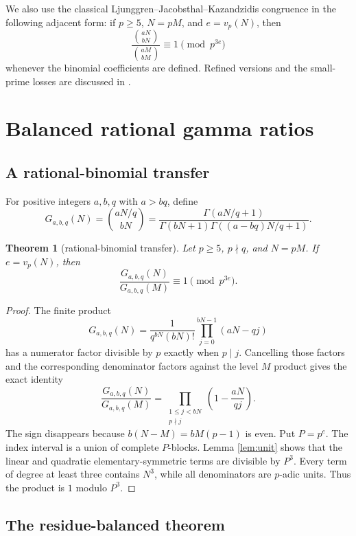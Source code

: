 \documentclass[11pt]{article}
\newtheorem{theorem}{Theorem}[section]
\theoremstyle{definition}
\begin{document}
We also use the classical Ljunggren--Jacobsthal--Kazandzidis congruence in
the following adjacent form: if $p\geq5$, $N=pM$, and $e=v_p(N)$, then
\begin{equation}\label{eq:LJK}
 \frac{\binom{aN}{bN}}{\binom{aM}{bM}}
 \equiv1\pmod {p^{3e}}
\end{equation}
whenever the binomial coefficients are defined.  Refined versions and the
small-prime losses are discussed in \cite{Kazandzidis,StraubLjunggren,Zudilin}.

\section{Balanced rational gamma ratios}

\subsection{A rational-binomial transfer}

For positive integers $a,b,q$ with $a>bq$, define
\[
 G_{a,b,q}(N)=\binom{aN/q}{bN}
 =\frac{\Gamma(aN/q+1)}{\Gamma(bN+1)\Gamma((a-bq)N/q+1)}.
\]

\begin{theorem}[rational-binomial transfer]\label{thm:rbin}
Let $p\geq5$, $p\nmid q$, and $N=pM$.  If $e=v_p(N)$, then
\[
 \frac{G_{a,b,q}(N)}{G_{a,b,q}(M)}\equiv1\pmod {p^{3e}}.
\]
\end{theorem}

\begin{proof}
The finite product
\[
 G_{a,b,q}(N)=\frac1{q^{bN}(bN)!}
 \prod_{j=0}^{bN-1}(aN-qj)
\]
has a numerator factor divisible by $p$ exactly when $p\mid j$.  Cancelling
those factors and the corresponding denominator factors against the level
$M$ product gives the exact identity
\[
 \frac{G_{a,b,q}(N)}{G_{a,b,q}(M)}
 =\prod_{\substack{1\leq j<bN\\p\nmid j}}
 \left(1-\frac{aN}{qj}\right).
\]
The sign disappears because $b(N-M)=bM(p-1)$ is even.  Put $P=p^e$.
The index interval is a union of complete $P$-blocks.  Lemma
\ref{lem:unit} shows that the linear and quadratic elementary-symmetric
terms are divisible by $P^3$.  Every term of degree at least three contains
$N^3$, while all denominators are $p$-adic units.  Thus the product is
$1$ modulo $P^3$.
\end{proof}

\subsection{The residue-balanced theorem}
\end{document}
